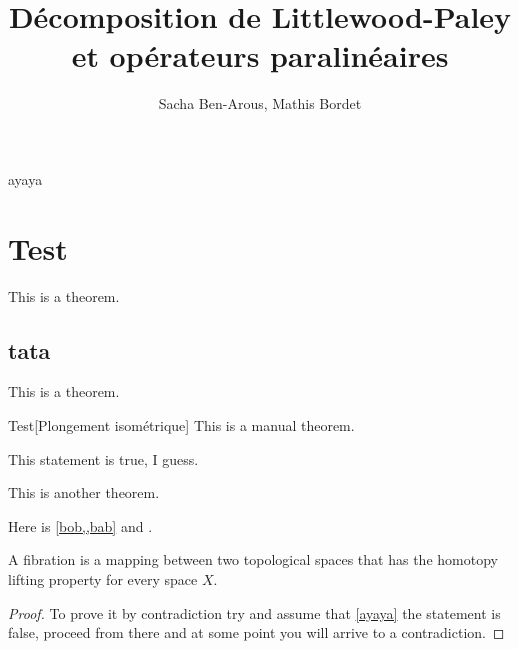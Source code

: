 \documentclass[11pt,a4paper]{article}
\title{\textbf{Décomposition de Littlewood-Paley et opérateurs paralinéaires}}
\date{}
\author{Sacha Ben-Arous, Mathis Bordet}
\begin{document}
\maketitle
ayaya
\section{Test}
\begin{theorem}\label{bob}
This is a theorem.
\end{theorem}
\subsection{tata}

\begin{theorem}\label{bab}
This is a theorem.
\end{theorem}

\begin{mth}{Test}[Plongement isométrique]\label{foo}
This is a manual theorem.
\end{mth}

\begin{rmq}
This statement is true, I guess.
\end{rmq}

\begin{theorem}
This is another theorem.
\end{theorem}
Here is \cref{bob,,bab} and .

\begin{defin}[Fibration]\label{ayaya}
A fibration is a mapping between two topological spaces that has the homotopy lifting property for every space \(X\).
\end{defin}

\begin{proof}
To prove it by contradiction try and assume that \cref{ayaya} the statement is false,
proceed from there and at some point you will arrive to a contradiction.
\end{proof}
\end{document}
